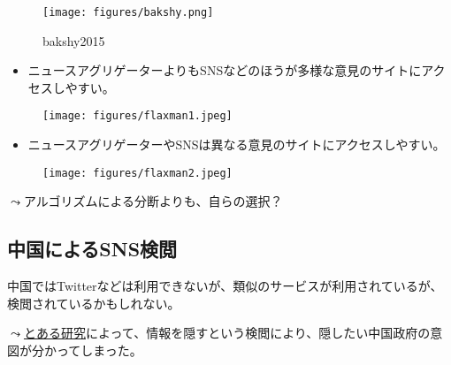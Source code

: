 \documentclass[
  xelatex,
  ja=standard]{bxjsarticle}
\providecommand{\tightlist}{%
  \setlength{\itemsep}{0pt}\setlength{\parskip}{0pt}}\usepackage{longtable,booktabs,array}
\begin{document}
\begin{figure}[htpb]

{\centering \texttt{[image: figures/bakshy.png]}

}

\caption{bakshy2015}

\end{figure}

\begin{itemize}
\tightlist
\item
  ニュースアグリゲーターよりもSNSなどのほうが多様な意見のサイトにアクセスしやすい。
\end{itemize}

\begin{figure}[htpb]

{\centering \texttt{[image: figures/flaxman1.jpeg]}

}

\caption{\citet{flaxman2016}}

\end{figure}

\begin{itemize}
\tightlist
\item
  ニュースアグリゲーターやSNSは異なる意見のサイトにアクセスしやすい。
\end{itemize}

\begin{figure}[htpb]

{\centering \texttt{[image: figures/flaxman2.jpeg]}

}

\caption{\citet{flaxman2016}}

\end{figure}

\(\leadsto\)アルゴリズムによる分断よりも、自らの選択？

\hypertarget{ux4e2dux56fdux306bux3088ux308bsnsux691cux95b2}{%
\subsection{中国によるSNS検閲}\label{ux4e2dux56fdux306bux3088ux308bsnsux691cux95b2}}

中国ではTwitterなどは利用できないが、類似のサービスが利用されているが、検閲されているかもしれない。

\(\leadsto\)\href{https://ipsj.ixsq.nii.ac.jp/ej/?action=pages_view_main\&active_action=repository_view_main_item_detail\&item_id=199708\&item_no=1\&page_id=13\&block_id=8}{とある研究}によって、情報を隠すという検閲により、隠したい中国政府の意図が分かってしまった。
\end{document}
